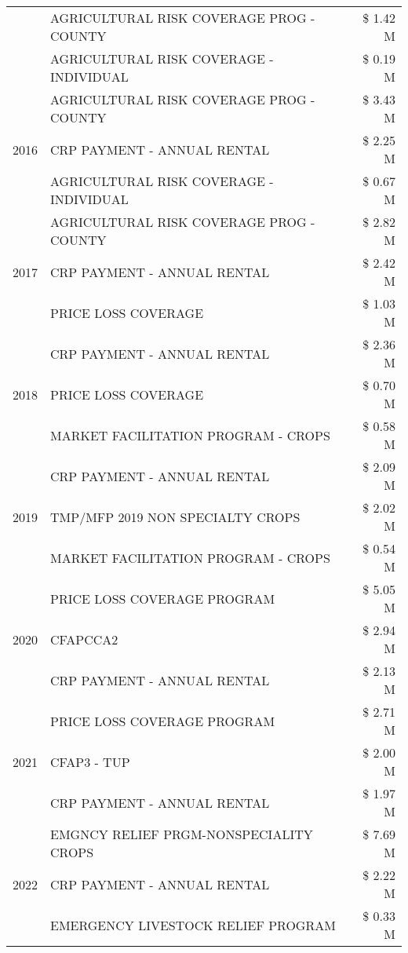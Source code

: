 \begin{tabular}{llr}
 & AGRICULTURAL RISK COVERAGE PROG - COUNTY & \$ 1.42 M \\
 & AGRICULTURAL RISK COVERAGE - INDIVIDUAL & \$ 0.19 M \\
\cline{1-3}
\multirow[t]{3}{*}{2016} & AGRICULTURAL RISK COVERAGE PROG - COUNTY & \$ 3.43 M \\
 & CRP PAYMENT - ANNUAL RENTAL & \$ 2.25 M \\
 & AGRICULTURAL RISK COVERAGE - INDIVIDUAL & \$ 0.67 M \\
\cline{1-3}
\multirow[t]{3}{*}{2017} & AGRICULTURAL RISK COVERAGE PROG - COUNTY & \$ 2.82 M \\
 & CRP PAYMENT - ANNUAL RENTAL & \$ 2.42 M \\
 & PRICE LOSS COVERAGE & \$ 1.03 M \\
\cline{1-3}
\multirow[t]{3}{*}{2018} & CRP PAYMENT - ANNUAL RENTAL & \$ 2.36 M \\
 & PRICE LOSS COVERAGE & \$ 0.70 M \\
 & MARKET FACILITATION PROGRAM - CROPS & \$ 0.58 M \\
\cline{1-3}
\multirow[t]{3}{*}{2019} & CRP PAYMENT - ANNUAL RENTAL & \$ 2.09 M \\
 & TMP/MFP 2019 NON SPECIALTY CROPS & \$ 2.02 M \\
 & MARKET FACILITATION PROGRAM - CROPS & \$ 0.54 M \\
\cline{1-3}
\multirow[t]{3}{*}{2020} & PRICE LOSS COVERAGE PROGRAM & \$ 5.05 M \\
 & CFAPCCA2 & \$ 2.94 M \\
 & CRP PAYMENT - ANNUAL RENTAL & \$ 2.13 M \\
\cline{1-3}
\multirow[t]{3}{*}{2021} & PRICE LOSS COVERAGE PROGRAM & \$ 2.71 M \\
 & CFAP3 - TUP & \$ 2.00 M \\
 & CRP PAYMENT - ANNUAL RENTAL & \$ 1.97 M \\
\cline{1-3}
\multirow[t]{3}{*}{2022} & EMGNCY RELIEF PRGM-NONSPECIALITY CROPS & \$ 7.69 M \\
 & CRP PAYMENT - ANNUAL RENTAL & \$ 2.22 M \\
 & EMERGENCY LIVESTOCK RELIEF PROGRAM & \$ 0.33 M \\
\cline{1-3}
\bottomrule
\end{tabular}
